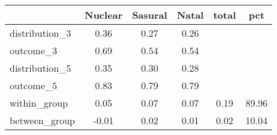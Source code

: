 \begin{tabular}{l*{5}{c}}
\toprule
            &\multicolumn{1}{c}{Nuclear}&\multicolumn{1}{c}{Sasural}&\multicolumn{1}{c}{Natal}&\multicolumn{1}{c}{total}&\multicolumn{1}{c}{pct}\\
\midrule
\midrule
distribution\_3&        0.36&        0.27&        0.26&            &            \\
outcome\_3   &        0.69&        0.54&        0.54&            &            \\
distribution\_5&        0.35&        0.30&        0.28&            &            \\
outcome\_5   &        0.83&        0.79&        0.79&            &            \\
within\_group&        0.05&        0.07&        0.07&        0.19&       89.96\\
between\_group&       -0.01&        0.02&        0.01&        0.02&       10.04\\
\bottomrule
\end{tabular}
